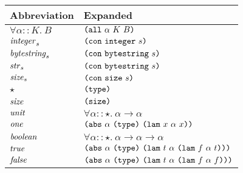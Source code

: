 \documentclass[../plutus-core-specification.tex]{subfiles}
\begin{document}
\newcommand{\builtinoffset}{-3cm} 

\newcommand\sep{4pt}

\newcommand{\Strut}{\rule[-2mm]{0mm}{6mm}}



\begin{minipage}{\linewidth}
\centering
    \begin{tabular}{|l|l|}
      \hline
      \Strut
        \textrm{Abbreviation} & \textrm{Expanded}\\
        \hline
        $\forall \alpha :: K.\ B$ & \(\texttt{(} \texttt{all} ~ \alpha ~ K ~ B \texttt{)}\) \rule{0mm}{4mm} \\[\sep]
        $\mathit{integer}_s$ & \(\texttt{(} \texttt{con} ~ \texttt{integer} ~ s \texttt{)}\)\\[\sep]
        
        $\mathit{bytestring}_s$ & \(\texttt{(} \texttt{con} ~ \texttt{bytestring} ~ s \texttt{)}\)\\[\sep]

        $\mathit{str}_s$ & \(\texttt{(} \texttt{con} ~ \texttt{bytestring} ~ s \texttt{)}\)\\[\sep]

        $\mathit{size}_s$ & \(\texttt{(} \texttt{con} ~ \texttt{size} ~ s \texttt{)}\)\\[\sep]

        $\star$ & \(\texttt{(} \texttt{type} \texttt{)}{}\)\\[\sep]

        $\mathit{size}$  & \(\texttt{(} \texttt{size} \texttt{)}{}\)\\[\sep]

        $\mathit{unit}$  & \(\forall \alpha :: \star.\ \alpha \to \alpha\)\\[\sep]

        $\mathit{one}$   & \(\texttt{(} \texttt{abs} ~ \alpha ~ \texttt{(} \texttt{type} \texttt{)}{} ~ \texttt{(} \texttt{lam} ~ x ~ \alpha ~ x \texttt{)} \texttt{)}\)\\[\sep]

        $\mathit{boolean}$ & \(\forall \alpha :: \star.\ \alpha \to \alpha \to \alpha\)\\[\sep]

        $\mathit{true}$  & \(\texttt{(} \texttt{abs} ~ \alpha ~ \texttt{(} \texttt{type} \texttt{)}{} ~ \texttt{(} \texttt{lam} ~ t ~ \alpha ~ \texttt{(} \texttt{lam} ~ f ~ \alpha ~ t \texttt{)} \texttt{)} \texttt{)}\)\\[\sep]

        $\mathit{false}$ & \(\texttt{(} \texttt{abs} ~ \alpha ~ \texttt{(} \texttt{type} \texttt{)}{} ~ \texttt{(} \texttt{lam} ~ t ~ \alpha ~ \texttt{(} \texttt{lam} ~ f ~ \alpha ~ f \texttt{)} \texttt{)} \texttt{)}\)\\[\sep]
\hline
    \end{tabular}

    \label{fig:Plutus_core_type_abbreviations}
\end{minipage}
\end{document}
